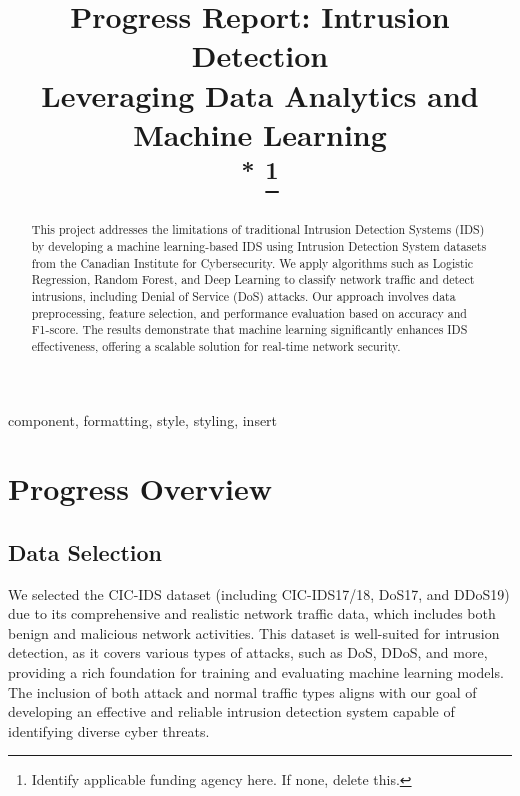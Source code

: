 \documentclass[conference]{IEEEtran}
\begin{document}
	
	\title{Progress Report: Intrusion Detection \\ 
		Leveraging Data Analytics and Machine Learning\\
		{\footnotesize \textsuperscript{*}}
		\thanks{Identify applicable funding agency here. If none, delete this.}
	}
	
	\author{
		\and
	}
	
	\maketitle
	
	\begin{abstract}
		This project addresses the limitations of traditional Intrusion Detection Systems (IDS) by developing a machine learning-based IDS using Intrusion Detection System datasets from the Canadian Institute for Cybersecurity. We apply algorithms such as Logistic Regression, Random Forest, and Deep Learning to classify network traffic and detect intrusions, including Denial of Service (DoS) attacks. Our approach involves data preprocessing, feature selection, and performance evaluation based on accuracy and F1-score. The results demonstrate that machine learning significantly enhances IDS effectiveness, offering a scalable solution for real-time network security.
	\end{abstract}
	
	\begin{IEEEkeywords}
		component, formatting, style, styling, insert
	\end{IEEEkeywords}
	
	\section{Progress Overview}
	\subsection{Data Selection}
	We selected the CIC-IDS dataset (including CIC-IDS17/18, DoS17, and DDoS19) due to its comprehensive and realistic network traffic data, which includes both benign and malicious network activities. This dataset is well-suited for intrusion detection, as it covers various types of attacks, such as DoS, DDoS, and more, providing a rich foundation for training and evaluating machine learning models. The inclusion of both attack and normal traffic types aligns with our goal of developing an effective and reliable intrusion detection system capable of identifying diverse cyber threats. 
	
\end{document}
